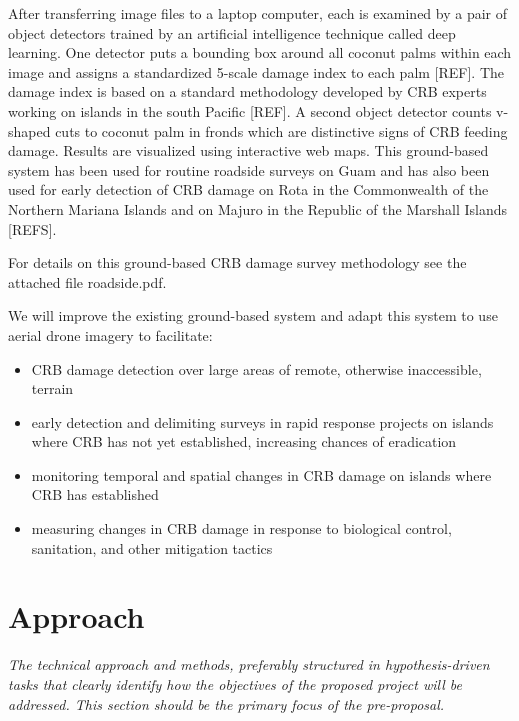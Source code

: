 \documentclass[11pt,english,letterpaper]{scrartcl}
\begin{document}
After transferring image files to a laptop computer, each is examined by a pair of object detectors trained by an artificial intelligence technique called deep learning. One detector puts a bounding box around all coconut palms within each image and assigns a standardized 5-scale damage index to each palm [REF]. The damage index is based on a standard methodology developed by CRB experts working on islands in the south Pacific [REF]. A second object detector counts v-shaped cuts to coconut palm in fronds which are distinctive signs of CRB feeding damage. Results are visualized using interactive web maps. This ground-based system has been used for routine roadside surveys on Guam and has also been used for early detection of CRB damage on Rota in the Commonwealth of the Northern Mariana Islands and on Majuro in the Republic of the Marshall Islands [REFS].

For details on this ground-based CRB damage survey methodology see the attached file roadside.pdf.

We will improve the existing ground-based system and adapt this system to use aerial drone imagery to facilitate:
\begin{itemize}
	\item CRB damage detection over large areas of remote, otherwise inaccessible, terrain
	\item early detection and delimiting surveys in rapid response projects on islands where CRB has not yet established, increasing chances of eradication
	\item monitoring temporal and spatial changes in CRB damage on islands where CRB has	established
	\item measuring changes in CRB damage in response to biological control, sanitation, and other mitigation tactics
\end{itemize}

\section{Approach}

\textit{The technical approach and methods, preferably structured in hypothesis-driven tasks that clearly identify how the objectives of the proposed project will be addressed. This section should be the primary focus of the pre-proposal.}
\end{document}
